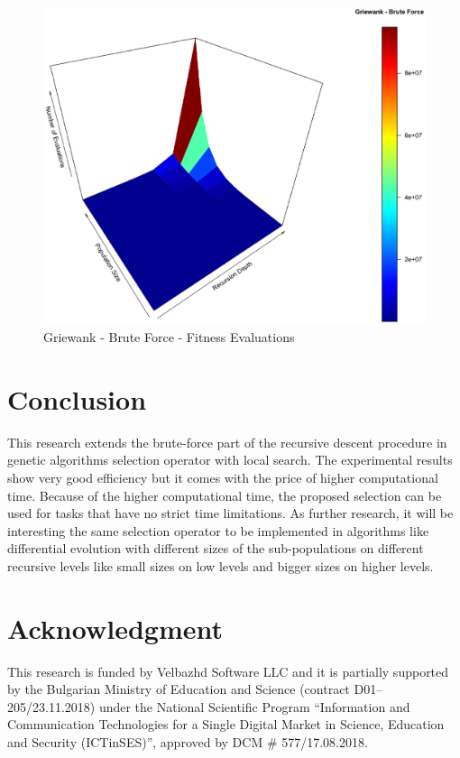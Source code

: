 \documentclass{svproc}
\begin{document}
\begin{figure}[tbp]
\centering
\includegraphics[width=1.0\hsize,height=0.65\hsize]{fig31.eps}
\caption{Griewank - Brute Force - Fitness Evaluations}
\label{fig30}
\end{figure}

\section{Conclusion}

This research extends the brute-force part of the recursive descent procedure in genetic algorithms selection operator with local search. The experimental results show very good efficiency but it comes with the price of higher computational time. Because of the higher computational time, the proposed selection can be used for tasks that have no strict time limitations. As further research, it will be interesting the same selection operator to be implemented in algorithms like differential evolution \cite{reddy-01} with different sizes of the sub-populations \cite{koumousis-01} on different recursive levels like small sizes on low levels and bigger sizes on higher levels. 

\section*{Acknowledgment}

This research is funded by Velbazhd Software LLC and it is partially supported by the Bulgarian Ministry of Education and Science (contract D01–205/23.11.2018) under the National Scientific Program ``Information and Communication Technologies for a Single Digital Market in Science, Education and Security (ICTinSES)'', approved by DCM \# 577/17.08.2018.
\end{document}
